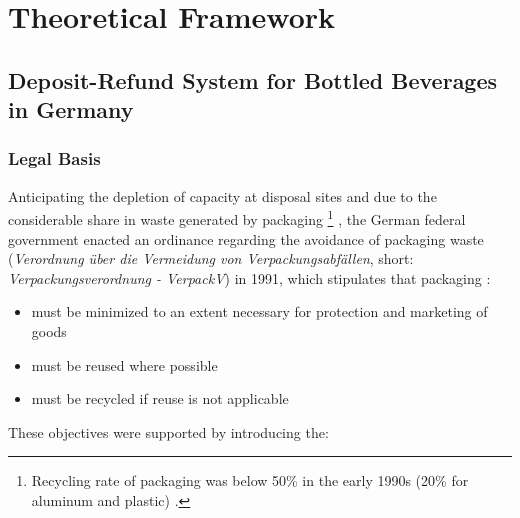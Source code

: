
\chapter{Theoretical Framework}
\label{chp:theoreticalFramework}

\section{Deposit-Refund System for Bottled Beverages in Germany}
\subsection{Legal Basis}
\label{sec:legalBasis}
Anticipating the depletion of capacity at disposal sites and due to the considerable share in waste generated by packaging \footnote{Recycling rate of packaging was below 50\% in the early 1990s (20\% for aluminum and plastic)  \cite[p.~2]{Hartlep2011Recycling}.} \cite[p.~2]{Hartlep2011Recycling}, the German federal government enacted an ordinance regarding the avoidance of packaging waste (\textit{Verordnung über die Vermeidung von Verpackungsabfällen}, short: \textit{Verpackungsverordnung - VerpackV}) in 1991, which stipulates that packaging \cite[§~1]{verpackV1991}:

\begin{itemize}
  \item must be minimized to an extent necessary for protection and marketing of goods
  \item must be reused where possible
  \item must be recycled if reuse is not applicable 
\end{itemize}

These objectives were supported by introducing the:


